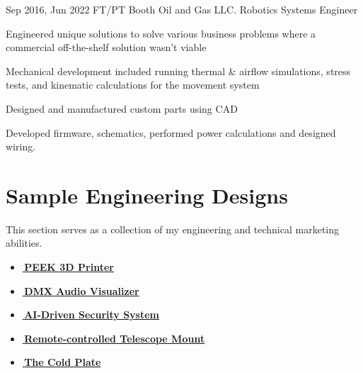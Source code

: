 \documentclass[
	12pt, %
]{FreemanCV}
\begin{document}
	
\jobentry
{Sep 2016, Jun 2022} %
{FT/PT} %
{Booth Oil and Gas LLC.} %
{Robotics Systems Engineer} %
{ %
	\item Engineered unique solutions to solve various business problems where a commercial off-the-shelf solution wasn't viable
	\item Mechanical development included running thermal \& airflow simulations, stress tests, and kinematic calculations for the movement system
	\item Designed and manufactured custom parts using CAD
	\item Developed firmware, schematics, performed power calculations and designed wiring.
}


\vspace*{-10pt}
\section{Sample Engineering Designs}
{
	This section serves as a collection of my engineering and technical marketing abilities.
	\vspace*{-7pt}
	\begin{itemize}[leftmargin=10pt]
		\itemsep-5pt
		\item \href{https://github.com/jfcbooth/3dpp}{\linkcolor\scriptsize\faLink\normalcolor\normalsize\,\textbf{PEEK 3D Printer}}
		\item \href{https://github.com/microchip-pic-avr-examples/pic16f56q71-audio-light-show-mplab-mcc}{\linkcolor\scriptsize\faLink\normalcolor\normalsize\,\textbf{DMX Audio Visualizer}}
		\item \href{https://github.com/jfcbooth/security_system}{\linkcolor\scriptsize\faLink\normalcolor\normalsize\,\textbf{AI-Driven Security System}}
		\item \href{https://github.com/jfcbooth/hadley_electric_stand}{\linkcolor\scriptsize\faLink\normalcolor\normalsize\,\textbf{Remote-controlled Telescope Mount}}
		\item \href{https://github.com/microchip-pic-avr-examples/pic16f17146-cold-plate-mplab-mcc}{\linkcolor\scriptsize\faLink\normalcolor\normalsize\,\textbf{The Cold Plate}}
	\end{itemize}
}
\end{document}
